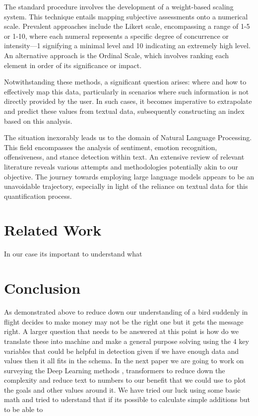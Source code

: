 \documentclass{article}
\begin{document}
The standard procedure involves the development of a weight-based scaling system. This technique entails mapping subjective assessments onto a numerical scale. Prevalent approaches include the Likert scale, encompassing a range of 1-5 or 1-10, where each numeral represents a specific degree of concurrence or intensity—1 signifying a minimal level and 10 indicating an extremely high level. An alternative approach is the Ordinal Scale, which involves ranking each element in order of its significance or impact.

Notwithstanding these methods, a significant question arises: where and how to effectively map this data, particularly in scenarios where such information is not directly provided by the user. In such cases, it becomes imperative to extrapolate and predict these values from textual data, subsequently constructing an index based on this analysis.

The situation inexorably leads us to the domain of Natural Language Processing. This field encompasses the analysis of sentiment, emotion recognition, offensiveness, and stance detection within text. An extensive review of relevant literature reveals various attempts and methodologies potentially akin to our objective. The journey towards employing large language models appears to be an unavoidable trajectory, especially in light of the reliance on textual data for this quantification process.


\section{Related Work}

In our case its important to understand what 

\section{Conclusion}
As demonstrated above to reduce down our understanding of a bird suddenly in flight decides to make money may not be the right one but it gets the message right. A larger question that needs to be answered at this point is how do we translate these into machine and make a general purpose solving using the 4 key variables that could be helpful in detection given if we have enough data and values then it all fits in the schema. In the next paper we are going to work on surveying the Deep Learning methods , transformers to reduce down the complexity and reduce text to numbers to our benefit that we could use to plot the goals and other values around it. We have tried our luck using some basic math and tried to uderstand that if its possible to calculate simple additions but to be able to 
\end{document}
